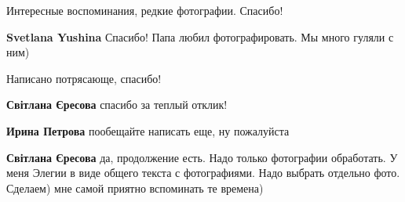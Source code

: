 \begin{itemize}
Интересные воспоминания, редкие фотографии. Спасибо!

\begin{itemize} %
\textbf{Svetlana Yushina} Спасибо! Папа любил фотографировать. Мы много гуляли с ним)
\end{itemize} %

Написано потрясающе, спасибо!

\begin{itemize} %
\textbf{Світлана Єресова} спасибо за теплый отклик!

\textbf{Ирина Петрова} пообещайте написать еще, ну пожалуйста

\textbf{Світлана Єресова} да, продолжение есть. Надо только фотографии обработать. У меня Элегии в виде общего текста с фотографиями. Надо выбрать отдельно фото. Сделаем) мне самой приятно вспоминать те времена)
\end{itemize} %

\end{itemize} %
